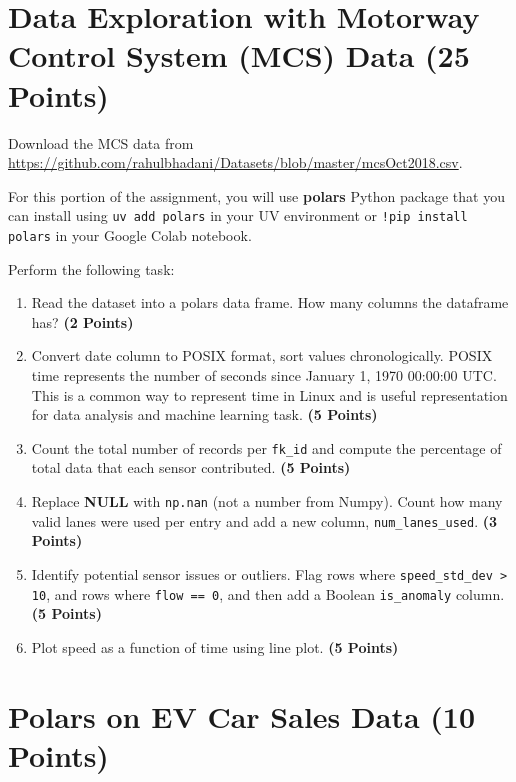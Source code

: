 \documentclass[12pt, xcolor=dvipsnames,svgnames,x11names]{article}
\begin{document}
\section{Data Exploration with Motorway Control System (MCS) Data (25 Points)}


Download the MCS data from \url{https://github.com/rahulbhadani/Datasets/blob/master/mcsOct2018.csv}.

For this portion of the assignment, you will use \textbf{polars} Python package that you can install using \texttt{uv add polars} in your UV environment or \texttt{!pip install polars} in your Google Colab notebook.

Perform the following task:

\begin{enumerate}
\item Read the dataset into a polars data frame. How many columns the dataframe has? \textbf{(2 Points)}

\item Convert date column to POSIX format, sort values chronologically. POSIX time represents the number of seconds since January 1, 1970 00:00:00 UTC. This is a common way to represent time in Linux and is  useful representation for data analysis and machine learning task. \textbf{(5 Points)}

\item Count the total number of records per \texttt{fk\_id} and compute the percentage of total data that each sensor
contributed. \textbf{(5 Points)}

\item Replace \textbf{NULL} with \texttt{np.nan} (not a number from Numpy). Count how many valid lanes were used per entry and add a new column,
\texttt{num\_lanes\_used}. \textbf{(3 Points)}

\item Identify potential sensor issues or outliers. Flag rows where \texttt{speed\_std\_dev > 10}, and rows where \texttt{flow ==
0}, and then add a Boolean \texttt{is\_anomaly} column. \textbf{(5 Points)}

\item Plot speed as a function of time using line plot. \textbf{(5 Points)}


\end{enumerate}


\section{Polars on EV Car Sales Data \textbf{(10 Points)}}
\end{document}
